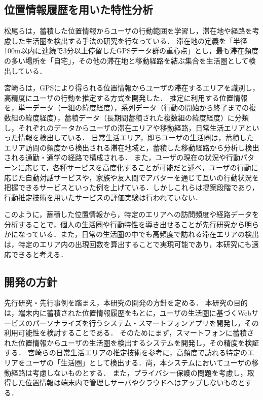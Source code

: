 \documentclass[a4paper]{jsarticle}
\begin{document}
\subsection{位置情報履歴を用いた特性分析}
松尾らは，蓄積した位置情報からユーザの行動範囲を学習し，滞在地や経路を考慮した生活圏を検出する手法の研究を行なっている\cite{matsuo}．
滞在地の定義を「半径100m以内に連続で3分以上停留したGPSデータ群の重心点」とし，最も滞在頻度の多い場所を「自宅」，その他の滞在地と移動経路を結ぶ集合を生活圏として検出している．

宮崎らは，GPSにより得られる位置情報からユーザの滞在するエリアを識別し，高精度にユーザの行動を推定する方式を開発した\cite{docomo}．
推定に利用する位置情報を，単一データ（一組の緯度経度），系列データ（行動の開始から終了までの複数組の緯度経度），蓄積データ（長期間蓄積された複数組の緯度経度）に分類し，それぞれのデータからユーザの滞在エリアや移動経路，日常生活エリアといった情報を検出している．
日常生活エリア，即ちユーザの生活圏は，蓄積したエリア訪問の頻度から検出される滞在地域と，蓄積した移動経路から分析し検出される通勤・通学の経路で構成される．
また，ユーザの現在の状況や行動パターンに応じて，各種サービスを高度化することが可能だと述べ，ユーザの行動に応じた自動対話サービスや，家族や友人間でアバターを通じて互いの行動状況を把握できるサービスといった例を上げている．しかしこれらは提案段階であり，行動推定技術を用いたサービスの評価実験は行われていない．

このように，蓄積した位置情報から，特定のエリアへの訪問頻度や経路データを分析することで，個人の生活圏や行動特性を導き出せることが先行研究から明らかになっている．また，日常の生活圏の中でも高頻度で訪れる滞在エリアの検出は，特定のエリア内の出現回数を算出することで実現可能であり，本研究にも適応できると考える．


\subsection{開発の方針}
先行研究・先行事例を踏まえ，本研究の開発の方針を定める．
本研究の目的は，端末内に蓄積された位置情報履歴をもとに，ユーザの生活圏に基づくWebサービスのパーソナライズを行うシステム・スマートフォンアプリを開発し，その利用可能性を検討することである．
そのためにまず，スマートフォンに蓄積された位置情報からユーザの生活圏を検出するシステムを開発し，その精度を検証する．
宮崎らの日常生活エリアの推定技術\cite{docomo}を参考に，高頻度で訪れる特定のエリアをユーザの「生活圏」として検出する．尚，本システムにおいてユーザの移動経路は考慮しないものとする．
また，プライバシー保護の問題を考慮し，取得した位置情報は端末内で管理しサーバやクラウドへはアップしないものとする．
\end{document}
